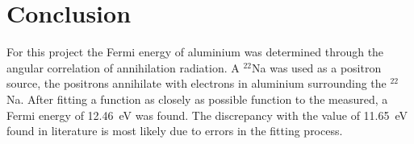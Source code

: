 \section{Conclusion}
For this project the Fermi energy of aluminium was determined through the angular correlation of annihilation radiation. A $^{22}$Na was used as a positron source, the positrons annihilate with electrons in aluminium surrounding the $^{22}$Na. After fitting a function as closely as possible function to the measured, a Fermi energy of 12.46~eV was found. The discrepancy with the value of 11.65~eV found in literature\cite{Massalski1978151, ashcroft1976solid} is most likely due to errors in the fitting process.